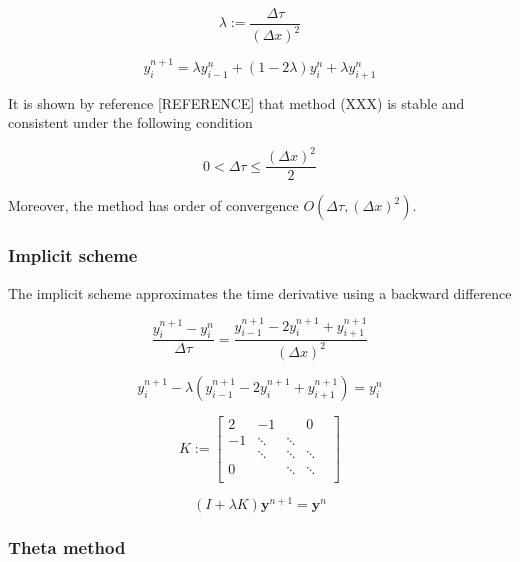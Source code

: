 \begin{equation}
  \lambda := \frac{\Delta \tau}{(\Delta x)^2}
\end{equation}

\begin{equation}
  y^{n+1}_i = \lambda y^{n}_{i-1} + (1 - 2\lambda)y^{n}_{i} + \lambda y^{n}_{i+1}
\end{equation}

It is shown by reference [REFERENCE] that method (XXX) is stable and consistent 
under the following condition

\begin{equation}
  0 < \Delta \tau \le \frac{(\Delta x)^2}{2}
\end{equation}

Moreover, the method has order of convergence $O(\Delta \tau, (\Delta x)^{2})$.

\subsubsection{Implicit scheme}

The implicit scheme approximates the time derivative using a backward difference

\begin{equation}
  \frac{y^{n+1}_{i} - y^{n}_{i}}{\Delta \tau} = \frac{y^{n+1}_{i-1} - 2y^{n+1}_{i} + y^{n+1}_{i+1}}{(\Delta x)^2}
\end{equation}

\begin{equation}
  y^{n+1}_{i} - \lambda (y^{n+1}_{i-1} - 2y^{n+1}_{i} + y^{n+1}_{i+1}) = y^{n}_{i}  
\end{equation}

\begin{equation}
  K := \begin{bmatrix}
    2 & -1     & & 0 \\ 
   -1 & \ddots & \ddots \\
      & \ddots & \ddots & \ddots \\
    0 & & \ddots & \ddots & \\
  \end{bmatrix} 
\end{equation}

\begin{equation}
  (I + \lambda K)\boldsymbol{y}^{n+1} = \boldsymbol{y}^{n}
\end{equation}

\subsubsection{Theta method}

